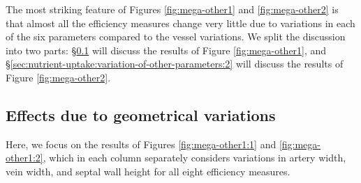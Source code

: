         The most striking feature of Figures \ref{fig:mega-other1} and \ref{fig:mega-other2} is that almost all the efficiency measures change very little due to variations in each of the six parameters compared to the vessel variations. We split the discussion into two parts: \S\ref{sec:nutrient-uptake:variation-of-other-parameters:1} will discuss the results of Figure \ref{fig:mega-other1}, and \S\ref{sec:nutrient-uptake:variation-of-other-parameters:2} will discuss the results of Figure \ref{fig:mega-other2}.

        \subsection{Effects due to geometrical variations} \label{sec:nutrient-uptake:variation-of-other-parameters:1}
            Here, we focus on the results of Figures \ref{fig:mega-other1:1} and \ref{fig:mega-other1:2}, which in each column separately considers variations in artery width, vein width, and septal wall height for all eight efficiency measures.

